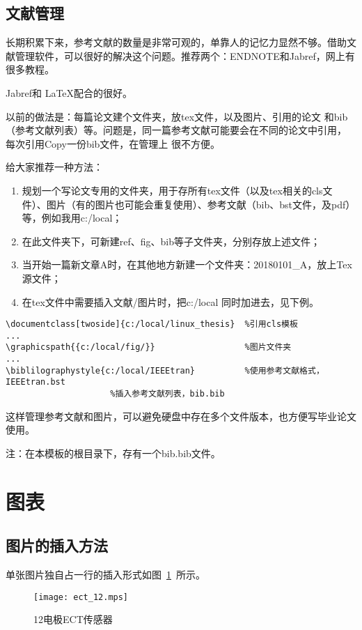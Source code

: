 \subsection{文献管理}
长期积累下来，参考文献的数量是非常可观的，单靠人的记忆力显然不够。借助文献管理软件，可以很好的解决这个问题。推荐两个：ENDNOTE和Jabref，网上有很多教程。

Jabref和 \LaTeX 配合的很好。

以前的做法是：每篇论文建个文件夹，放tex文件，以及图片、引用的论文 和bib（参考文献列表）等。问题是，同一篇参考文献可能要会在不同的论文中引用， 每次引用Copy一份bib文件，在管理上 很不方便。

给大家推荐一种方法：

\begin{enumerate}
  \item 规划一个写论文专用的文件夹，用于存所有tex文件（以及tex相关的cls文件）、图片（有的图片也可能会重复使用）、参考文献（bib、bst文件，及pdf）等，例如我用c:/local；
  \item 在此文件夹下，可新建ref、fig、bib等子文件夹，分别存放上述文件；
  \item 当开始一篇新文章A时，在其他地方新建一个文件夹：20180101\_A，放上Tex源文件；
  \item 在tex文件中需要插入文献/图片时，把c:/local 同时加进去，见下例。
\end{enumerate}

\begin{verbatim}
\documentclass[twoside]{c:/local/linux_thesis}  %引用cls模板
...
\graphicspath{{c:/local/fig/}}                  %图片文件夹
...
\biblilographystyle{c:/local/IEEEtran}          %使用参考文献格式，IEEEtran.bst
                     %插入参考文献列表，bib.bib
\end{verbatim}

这样管理参考文献和图片，可以避免硬盘中存在多个文件版本，也方便写毕业论文使用。

注：在本模板的根目录下，存有一个bib.bib文件。



\section{图表}
\subsection{图片的插入方法}
单张图片独自占一行的插入形式如图~\ref{fig:dect_12}~所示。
\begin{figure}[htbp]
\centering
\texttt{[image: ect\_12.mps]}
\caption{12电极ECT传感器}\label{fig:dect_12}
\vspace{\baselineskip}
\end{figure}



